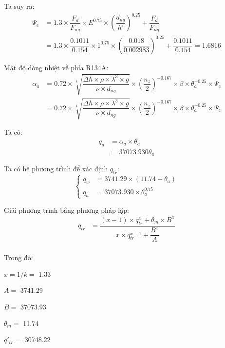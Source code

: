 Ta suy ra:
\begin{equation*}
\begin{split}
		\Psi_{c} &= 1.3\times\dfrac{F_{d}}{F_{ng}}\times E^{0.75}\times\left(\dfrac{d_{ng}}{h'}\right)^{0.25} + \dfrac{F_{d}}{F_{ng}}\\
		&=1.3 \times \dfrac{0.1011}{0.154} \times 1^{0.75} \times (\dfrac{0.018}{0.002983})^{0.25} + \dfrac{0.1011}{0.154}= 1.6816
\end{split}
\end{equation*}

Mật độ dòng nhiệt về phía R134A:
\begin{equation*}
	\begin{split}
		\alpha_{a} &= 0.72\times\sqrt[4]{\dfrac{\Delta h\times \rho\times\lambda^3\times g}{\nu\times d_{ng}}}\times\left(\dfrac{n_{z}}{2}\right)^{-0.167}\times\beta\times\theta^{-0.25}_{a}\times\Psi_{c} \\
		&=0.72\times\sqrt[4]{\dfrac{\Delta h\times \rho\times\lambda^3\times g}{\nu\times d_{ng}}}\times\left(\dfrac{n_{z}}{2}\right)^{-0.167}\times\beta\times\theta^{-0.25}_{a}\times\Psi_{c}
	\end{split}
\end{equation*}

Ta có: 
\begin{equation*}
\begin{split}
		q_{a} &= \alpha_{a}\times\theta_{a}\\
		&=37073.930\theta_{a}
\end{split}
\end{equation*}

Ta có hệ phương trình để xác định $q_{tr}$:
\begin{equation*}
	\begin{cases}
		q_{w} &= 3741.29\times(11.74 - \theta_{a}) \\
		q_{a} &= 37073.930\times\theta_{a}^{0.75}
	\end{cases}
\end{equation*}

Giải phương trình bằng phương pháp lặp:
\begin{equation*}
	\begin{split}
		q_{tr} &= \dfrac{(x - 1)\times q_{tr}^{x} + \theta_{m}\times B^{x}}{x\times q_{tr}^{x-1} + \dfrac{B^{x}}{A}}\\
	\end{split}
\end{equation*}

Trong đó:
\begin{itemize}
\begin{multicols}{3}
	\item $x = 1/k = $ 1.33
	\item $A = $ 3741.29
	\item $B = $ 37073.93
	\item $\theta_{m} = $ 11.74
	\item $q'_{tr} = $ 30748.22
\end{multicols}
\end{itemize}

